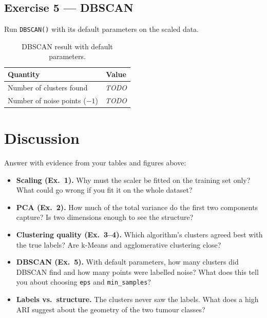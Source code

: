 \documentclass[11pt,a4paper]{article}
\begin{document}
\subsection{Exercise 5 — DBSCAN}
Run \lstinline|DBSCAN()| with its default parameters on the scaled data.
\begin{table}[H]
\centering
\caption{DBSCAN result with default parameters.}
\label{tab:dbscan}
\begin{tabular}{@{}lc@{}}
\toprule
\textbf{Quantity} & \textbf{Value} \\
\midrule
Number of clusters found & \textit{TODO} \\
Number of noise points ($-1$) & \textit{TODO} \\
\bottomrule
\end{tabular}
\end{table}

\section{Discussion}
Answer with evidence from your tables and figures above:
\begin{itemize}[leftmargin=*]
  \item \textbf{Scaling (Ex.~1).} Why must the scaler be fitted on the training
        set only? What could go wrong if you fit it on the whole dataset?
  \item \textbf{PCA (Ex.~2).} How much of the total variance do the first two
        components capture? Is two dimensions enough to see the structure?
  \item \textbf{Clustering quality (Ex.~3--4).} Which algorithm's clusters agreed
        best with the true labels? Are k-Means and agglomerative clustering close?
  \item \textbf{DBSCAN (Ex.~5).} With default parameters, how many clusters did
        DBSCAN find and how many points were labelled noise? What does this tell
        you about choosing \lstinline|eps| and \lstinline|min_samples|?
  \item \textbf{Labels vs.\ structure.} The clusters never saw the labels. What
        does a high ARI suggest about the geometry of the two tumour classes?
\end{itemize}

\end{document}

